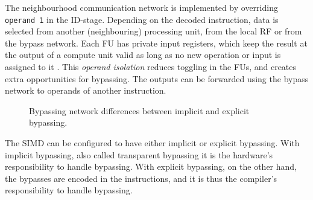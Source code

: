 The neighbourhood communication network is implemented by overriding \texttt{operand 1} in the ID-stage. Depending on the decoded instruction, data is selected from another (neighbouring) processing unit, from the local RF or from the bypass network. Each FU has private input registers, which keep the result at the output of a compute unit valid as long as no new operation or input is assigned to it \cite{dongrio1}. This \emph{operand isolation} reduces toggling in the FUs, and creates extra opportunities for bypassing. The outputs can be forwarded using the bypass network to operands of another instruction.

\begin{figure}[b!]
\centering
{}
\hfil
{}
\caption{Bypassing network differences between implicit and explicit bypassing.}
\label{fig:datapath_approaches}
\end{figure}

The SIMD can be configured to have either implicit or explicit bypassing. With implicit bypassing, also called transparent bypassing it is the hardware's responsibility to handle bypassing. With explicit bypassing, on the other hand, the bypasses are encoded in the instructions, and it is thus the compiler's responsibility to handle bypassing.

